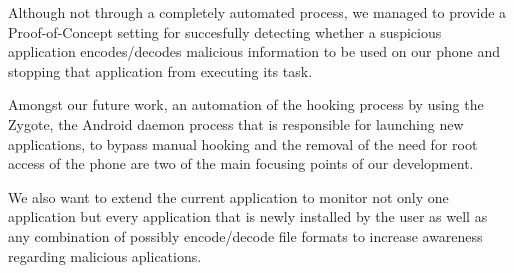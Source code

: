 Although not through a completely automated process, we 
managed to provide a Proof-of-Concept setting for succesfully 
detecting whether a suspicious application encodes/decodes 
malicious information to be used on our phone and stopping
that application from executing its task.

Amongst our future work, an automation of the hooking 
process by using the Zygote, the Android daemon process 
that is responsible for launching new applications, to bypass 
manual hooking and the removal of the need for root access 
of the phone are two of the main focusing points of our development.

We also want to extend the current application to monitor not 
only one application but every application that is newly installed
 by the user as well as any combination of possibly encode/decode
 file formats to increase awareness regarding malicious aplications.